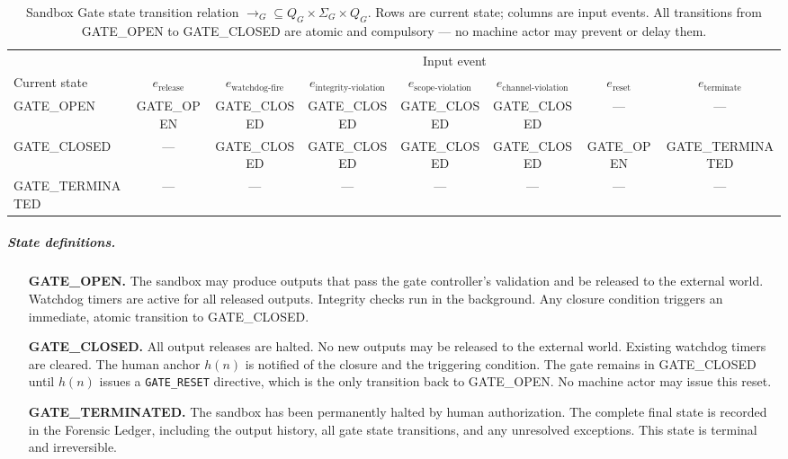 \begin{table}[htbp]
\caption{Sandbox Gate state transition relation $\rightarrow_G \subseteq Q_G \times \Sigma_G \times Q_G$. Rows are current state; columns are input events. All transitions from GATE\_OPEN to GATE\_CLOSED are atomic and compulsory — no machine actor may prevent or delay them.}
\label{tab:gate-transition}
\begin{tabular}{@{}lccccccc@{}}
\toprule
 & \multicolumn{7}{c}{Input event} \\
\cmidrule(l){2-8}
Current state & $e_{\text{release}}$ & $e_{\text{watchdog-fire}}$ & $e_{\text{integrity-violation}}$ & $e_{\text{scope-violation}}$ & $e_{\text{channel-violation}}$ & $e_{\text{reset}}$ & $e_{\text{terminate}}$ \\
\midrule
GATE\_OPEN & GATE\_OPEN & GATE\_CLOSED & GATE\_CLOSED & GATE\_CLOSED & GATE\_CLOSED & — & — \\
GATE\_CLOSED & — & GATE\_CLOSED & GATE\_CLOSED & GATE\_CLOSED & GATE\_CLOSED & GATE\_OPEN & GATE\_TERMINATED \\
GATE\_TERMINATED & — & — & — & — & — & — & — \\
\bottomrule
\end{tabular}
\end{table}

\subparagraph{State definitions.}

\begin{itemize}\itemsep=0pt
\item[\textbf{GATE\_OPEN.}] The sandbox may produce outputs that pass the gate controller's validation and be released to the external world. Watchdog timers are active for all released outputs. Integrity checks run in the background. Any closure condition triggers an immediate, atomic transition to GATE\_CLOSED.

\item[\textbf{GATE\_CLOSED.}] All output releases are halted. No new outputs may be released to the external world. Existing watchdog timers are cleared. The human anchor $h(n)$ is notified of the closure and the triggering condition. The gate remains in GATE\_CLOSED until $h(n)$ issues a \texttt{GATE\_RESET} directive, which is the only transition back to GATE\_OPEN. No machine actor may issue this reset.

\item[\textbf{GATE\_TERMINATED.}] The sandbox has been permanently halted by human authorization. The complete final state is recorded in the Forensic Ledger, including the output history, all gate state transitions, and any unresolved exceptions. This state is terminal and irreversible.
\end{itemize}

